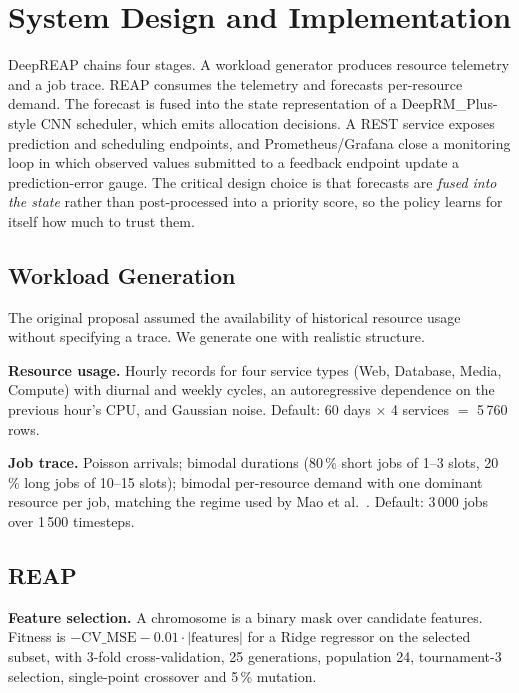 \documentclass[runningheads]{llncs}
\begin{document}
\section{System Design and Implementation}

DeepREAP chains four stages. A workload generator produces resource
telemetry and a job trace. REAP consumes the telemetry and forecasts
per-resource demand. The forecast is fused into the state
representation of a DeepRM\_Plus-style CNN scheduler, which emits
allocation decisions. A REST service exposes prediction and scheduling
endpoints, and Prometheus/Grafana close a monitoring loop in which
observed values submitted to a feedback endpoint update a
prediction-error gauge. The critical design choice is that forecasts
are \emph{fused into the state} rather than post-processed into a
priority score, so the policy learns for itself how much to trust
them.

\subsection{Workload Generation}

The original proposal assumed the availability of historical resource
usage without specifying a trace. We generate one with realistic
structure.

\textbf{Resource usage.} Hourly records for four service types (Web,
Database, Media, Compute) with diurnal and weekly cycles, an
autoregressive dependence on the previous hour's CPU, and Gaussian
noise. Default: 60 days $\times$ 4 services $=$ 5\,760 rows.

\textbf{Job trace.} Poisson arrivals; bimodal durations (80\,\% short
jobs of 1--3 slots, 20\,\% long jobs of 10--15 slots); bimodal
per-resource demand with one dominant resource per job, matching the
regime used by Mao et al.~\cite{mao2016}. Default: 3\,000 jobs over
1\,500 timesteps.

\subsection{REAP}

\textbf{Feature selection.} A chromosome is a binary mask over
candidate features. Fitness is
$-\mathrm{CV\_MSE} - 0.01 \cdot |\text{features}|$
for a Ridge regressor on the selected subset, with 3-fold
cross-validation, 25 generations, population 24, tournament-3
selection, single-point crossover and 5\,\% mutation.
\end{document}
